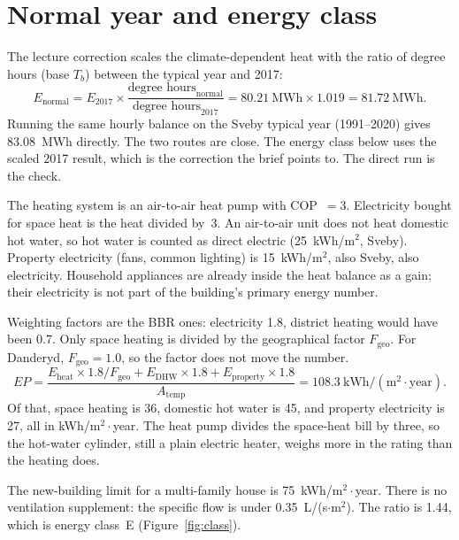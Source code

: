 \documentclass[11pt,a4paper]{article}
\begin{document}
\section{Normal year and energy class}

The lecture correction scales the climate-dependent heat with the ratio
of degree hours (base $T_b$) between the typical year and 2017:
\begin{equation}
  E_{\mathrm{normal}}
  = E_{2017} \times \frac{\text{degree hours}_{\mathrm{normal}}}
                         {\text{degree hours}_{2017}}
  = 80.21~\mathrm{MWh} \times 1.019
  = 81.72~\mathrm{MWh}.
  \label{eq:normal}
\end{equation}
Running the same hourly balance on the Sveby typical year (1991--2020)
gives 83.08~MWh directly. The two routes are close. The energy class
below uses the scaled 2017 result, which is the correction the brief
points to. The direct run is the check.

The heating system is an air-to-air heat pump with COP~$= 3$.
Electricity bought for space heat is the heat divided by~3.
An air-to-air unit does not heat domestic hot water, so hot water is
counted as direct electric (25~kWh/m$^{2}$, Sveby).
Property electricity (fans, common lighting) is 15~kWh/m$^{2}$, also
Sveby, also electricity. Household appliances are already inside the
heat balance as a gain; their electricity is not part of the building's
primary energy number.

Weighting factors are the BBR ones: electricity 1.8, district heating
would have been 0.7. Only space heating is divided by the geographical
factor $F_{\mathrm{geo}}$. For Danderyd, $F_{\mathrm{geo}} = 1.0$, so the
factor does not move the number.
\begin{equation}
  \mathit{EP}
  = \frac{E_{\mathrm{heat}} \times 1.8 / F_{\mathrm{geo}}
        + E_{\mathrm{DHW}} \times 1.8
        + E_{\mathrm{property}} \times 1.8}
       {A_{\mathrm{temp}}}
  = 108.3~\mathrm{kWh/(m^{2}{\cdot}year)}.
  \label{eq:ep}
\end{equation}
Of that, space heating is 36, domestic hot water is 45, and property
electricity is 27, all in kWh/m$^{2}{\cdot}$year.
The heat pump divides the space-heat bill by three, so the hot-water
cylinder, still a plain electric heater, weighs more in the rating than
the heating does.

The new-building limit for a multi-family house is
75~kWh/m$^{2}{\cdot}$year. There is no ventilation supplement: the
specific flow is under 0.35~L/(s$\cdot$m$^{2}$).
The ratio is 1.44, which is energy class~E
(Figure~\ref{fig:class}).
\end{document}
